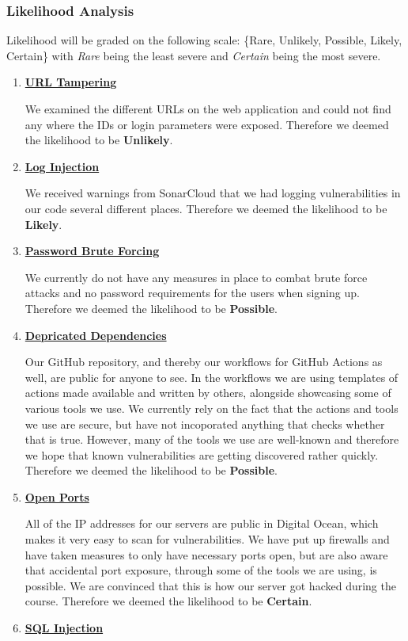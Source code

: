 \subsubsection{Likelihood Analysis}
Likelihood will be graded on the following scale: \{Rare, Unlikely, Possible, Likely, Certain\} with \textit{Rare} being the least severe and \textit{Certain} being the most severe.
\begin{enumerate}
    \item \textbf{\underline{URL Tampering}}

    We examined the different URLs on the web application and could not find any where the IDs or login parameters were exposed. Therefore we deemed the likelihood to be \textbf{Unlikely}.
    \item \textbf{\underline{Log Injection}}

    We received warnings from SonarCloud that we had logging vulnerabilities in our code several different places. Therefore we deemed the likelihood to be \textbf{Likely}.

    \item \textbf{\underline{Password Brute Forcing}}

    We currently do not have any measures in place to combat brute force attacks and no password requirements for the users when signing up. Therefore we deemed the likelihood to be \textbf{Possible}.
    \item \textbf{\underline{Depricated Dependencies}}

    Our GitHub repository, and thereby our workflows for GitHub Actions as well, are public for anyone to see. In the workflows we are using templates of actions made available and written by others, alongside showcasing some of various tools we use. We currently rely on the fact that the actions and tools we use are secure, but have not incoporated anything that checks whether that is true. However, many of the tools we use are well-known and therefore we hope that known vulnerabilities are getting discovered rather quickly. Therefore we deemed the likelihood to be \textbf{Possible}.
    \item \textbf{\underline{Open Ports}}

    All of the IP addresses for our servers are public in Digital Ocean, which makes it very easy to scan for vulnerabilities. We have put up firewalls and have taken measures to only have necessary ports open, but are also aware that accidental port exposure, through some of the tools we are using, is possible. We are convinced that this is how our server got hacked during the course. Therefore we deemed the likelihood to be \textbf{Certain}.
    \item \textbf{\underline{SQL Injection}}


\end{enumerate}
